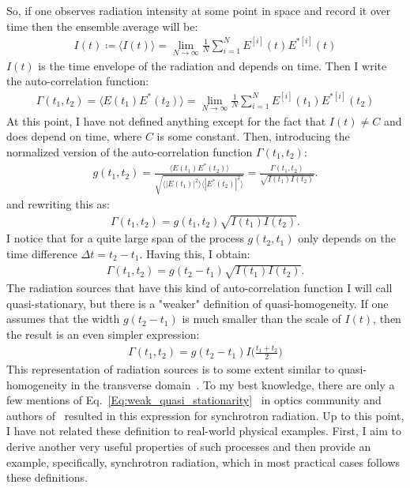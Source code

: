     So, if one observes radiation intensity at some point in space and record it over time then the ensemble average will be:
    \begin{align}
        I(t) \coloneqq \langle I(t) \rangle = \lim_{N\to\infty} \frac{1}{N}\sum_{i=1}^{N} E^{[i]}(t)E^{*[i]}(t)
    \end{align}
    $I(t)$ is the time envelope of the radiation and depends on time. Then I write the auto-correlation function:
    \begin{align}
        \Gamma(t_1, t_2) = \langle E(t_1)E^*(t_2) \rangle = \lim_{N\to\infty} \frac{1}{N}\sum_{i=1}^{N} E^{[i]}(t_1)E^{*[i]}(t_2)
    \end{align}
    At this point, I have not defined anything except for the fact that $I(t) \neq C$ and does depend on time, where $C$ is some constant. Then, introducing the normalized version of the auto-correlation function $\Gamma(t_1, t_2)$:
    \begin{align}
        g(t_1, t_2) = \frac{\langle E(t_1)E^*(t_2)\rangle}{\sqrt{\langle |E(t_1)|^2\rangle \langle |E^*(t_2)|^2\rangle}} = \frac{\Gamma(t_1, t_2)}{\sqrt{ I(t_1) I(t_2)}}.
    \end{align} 
    and rewriting this as: 
    \begin{align}
        \Gamma(t_1, t_2) = g(t_1, t_2) \sqrt{I(t_1) I(t_2)}.
    \end{align}
    I notice that for a quite large span of the process $g(t_2, t_1)$ only depends on the time difference $\Delta t = t_2 - t_1$. Having this, I obtain:
    \begin{align}
        \Gamma(t_1, t_2) = g(t_2 - t_1) \sqrt{I(t_1) I(t_2)}.
        \label{Eq:Strict_quasi_stationarity}
    \end{align}
    The radiation sources that have this kind of auto-correlation function I will call quasi-stationary, but there is a "weaker" definition of quasi-homogeneity. If one assumes that the width $g(t_2 - t_1)$ is much smaller than the scale of $I(t)$, then the result is an even simpler expression:
    \begin{align}
        \Gamma(t_1, t_2) = g(t_2 - t_1)I\bigg(\frac{t_1 + t_2}{2}\bigg)
        \label{Eq:weak_quasi_stationarity}
    \end{align}
    This representation of radiation sources is to some extent similar to quasi-homogeneity in the transverse domain~\cite{goodman_statistical_2015}. To my best knowledge, there are only a few mentions of Eq.~\ref{Eq:weak_quasi_stationarity}~\cite{lajunen_quasi-stationary_2006, ahad_quasi-monochromatic_2017} in optics community and authors of~\cite{geloni_statistical_2006} resulted in this expression for synchrotron radiation. Up to this point, I have not related these definition to real-world physical examples. First, I aim to derive another very useful properties of such processes and then provide an example, specifically, synchrotron radiation, which in most practical cases follows these definitions.

